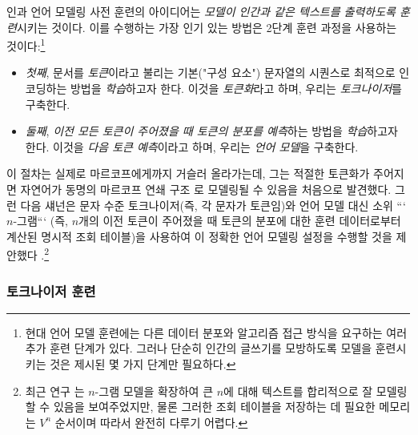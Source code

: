 \documentclass[../../book-main_ko.tex]{subfiles}
\begin{document}
인과 언어 모델링 사전 훈련의 아이디어는 \textit{모델이 인간과 같은 텍스트를 출력하도록 훈련}시키는 것이다. 이를 수행하는 가장 인기 있는 방법은 2단계 훈련 과정을 사용하는 것이다:\footnote{현대 언어 모델 훈련에는 다른 데이터 분포와 알고리즘 접근 방식을 요구하는 여러 추가 훈련 단계가 있다. 그러나 단순히 인간의 글쓰기를 모방하도록 모델을 훈련시키는 것은 제시된 몇 가지 단계만 필요하다.}
\begin{itemize}
    \item \textit{첫째}, 문서를 \textit{토큰}이라고 불리는 기본("구성 요소") 문자열의 시퀀스로 최적으로 인코딩하는 방법을 \textit{학습}하고자 한다. 이것을 \textit{토큰화}라고 하며, 우리는 \textit{토크나이저}를 구축한다.
    \item \textit{둘째}, \textit{이전 모든 토큰이 주어졌을 때 토큰의 분포를 예측}하는 방법을 \textit{학습}하고자 한다. 이것을 \textit{다음 토큰 예측}이라고 하며, 우리는 \textit{언어 모델}을 구축한다.
\end{itemize}
이 절차는 실제로 마르코프에게까지 거슬러 올라가는데, 그는 적절한 토큰화가 주어지면 자연어가 동명의 마르코프 연쇄 구조 \citep{markov2006example}로 모델링될 수 있음을 처음으로 발견했다. 그런 다음 섀넌은 문자 수준 토크나이저(즉, 각 문자가 토큰임)와 언어 모델 대신 소위 ```\(n\)-그램``` (즉, \(n\)개의 이전 토큰이 주어졌을 때 토큰의 분포에 대한 훈련 데이터로부터 계산된 명시적 조회 테이블)을 사용하여 이 정확한 언어 모델링 설정을 수행할 것을 제안했다 \citep{Shannon-1948}.\footnote{최근 연구 \citep{liu2024infini}는 \(n\)-그램 모델을 확장하여 큰 \(n\)에 대해 텍스트를 합리적으로 잘 모델링할 수 있음을 보여주었지만, 물론 그러한 조회 테이블을 저장하는 데 필요한 메모리는 \(V^{n}\) 순서이며 따라서 완전히 다루기 어렵다.}

\subsubsection{토크나이저 훈련}
\end{document}

